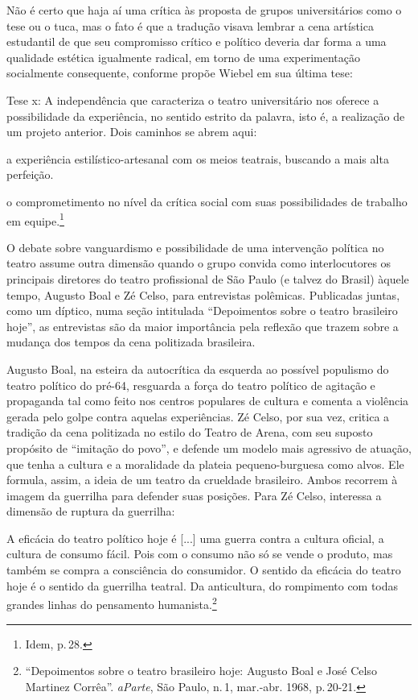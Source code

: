 {Não é certo que haja aí uma crítica às proposta de grupos universitários
como o {\sc tese} ou o {\sc tuca}, mas o fato é que a tradução visava lembrar a cena
artística estudantil de que seu compromisso crítico e político deveria
dar forma a uma qualidade estética igualmente radical, em torno de uma
experimentação socialmente consequente, conforme propõe Wiebel em sua
última tese:

\startblockquote
Tese {\sc x}: A independência que caracteriza o teatro universitário
nos oferece a possibilidade da experiência, no sentido estrito da
palavra, isto é, a realização de um projeto anterior. Dois caminhos se
abrem aqui:

\startitemize[n,packed]
\item a experiência estilístico-artesanal com os meios teatrais, buscando a
mais alta perfeição.

\item o comprometimento no nível da crítica social com suas possibilidades
de trabalho em equipe.\footnote{Idem, p.\,28.}
\stopitemize
\stopblockquote

O debate sobre vanguardismo e possibilidade de uma intervenção
política no teatro assume outra dimensão quando o grupo convida como
interlocutores os principais diretores do teatro profissional de São
Paulo (e talvez do Brasil) àquele tempo, Augusto Boal e Zé Celso, para
entrevistas polêmicas. Publicadas juntas, como um díptico, numa seção
intitulada “Depoimentos sobre o teatro brasileiro hoje”, as
entrevistas são da maior importância pela reflexão que trazem sobre a
mudança dos tempos da cena politizada brasileira.

Augusto Boal, na esteira da autocrítica da esquerda ao possível
populismo do teatro político do pré-64, resguarda a força do teatro
político de agitação e propaganda tal como feito nos centros populares
de cultura e comenta a violência gerada pelo golpe contra aquelas
experiências. Zé Celso, por sua vez, critica a tradição da cena
politizada no estilo do Teatro de Arena, com seu suposto propósito de
“imitação do povo”, e defende um modelo mais agressivo de atuação, que
tenha a cultura e a moralidade da plateia pequeno-burguesa como alvos.
Ele formula, assim, a ideia de um teatro da crueldade brasileiro. Ambos
recorrem à imagem da guerrilha para defender suas posições. Para Zé
Celso, interessa a dimensão de ruptura da guerrilha:

\startblockquote
A eficácia do teatro político hoje é {[}...{]} uma guerra contra a
cultura oficial, a cultura de consumo fácil. Pois com o consumo não só
se vende o produto, mas também se compra a consciência do consumidor. O
sentido da eficácia do teatro hoje é o sentido da guerrilha teatral. Da
anticultura, do rompimento com todas grandes linhas do pensamento
humanista.\footnote{“Depoimentos sobre o teatro brasileiro hoje: Augusto
  Boal e José Celso Martinez Corrêa”. {\it aParte}, São Paulo, n.\,1,
  mar.-abr. 1968, p.\,20-21.}
\stopblockquote

}
